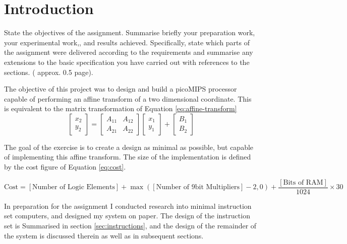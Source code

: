 \section{Introduction}

\review
{
	State the objectives of the assignment. Summarise briefly your preparation work,  your experimental work,, and results achieved. Specifically, state which parts of the assignment were delivered according to the requirements and summarise any extensions to the basic specification you have carried out with references to the sections.  ( approx. 0.5 page).
}

The objective of this project was to design and build a picoMIPS processor capable of performing an affine transform of a two dimensional coordinate. This is equivalent to the matrix transformation of Equation \ref{eq:affine-transform}
\begin{equation}
\begin{bmatrix}
x_2\\
y_2
\end{bmatrix}
=
\begin{bmatrix}
A_{11} & A_{12}\\
A_{21} & A_{22}
\end{bmatrix}
\begin{bmatrix}
x_1\\
y_1
\end{bmatrix}
+
\begin{bmatrix}
B_1\\
B_2
\end{bmatrix}
\label{eq:affine-transform}
\end{equation}

The goal of the exercise is to create a design as minimal as possible, but capable of implementing this affine transform. The size of the implementation is defined by the cost figure of Equation \ref{eq:cost}.

\begin{equation}
	\text{Cost} = [\text{Number of Logic Elements}] + \max([\text{Number of 9bit Multipliers}] -2, 0) + \frac{ [\text{Bits of RAM}]}{1024} \times 30
	\label{eq:cost}
\end{equation}

In preparation for the assignment I conducted research into minimal instruction set computers, and designed my system on paper. The design of the instruction set is Summarised in section \ref{sec:instructions}, and the design of the remainder of the system is discussed therein as well as in subsequent sections.

